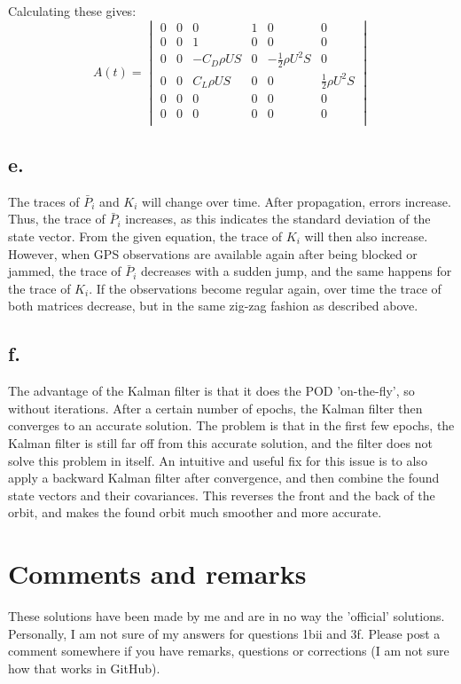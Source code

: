 \documentclass[a4paper,10pt,titlepage]{article}
\begin{document}
Calculating these gives:
\begin{equation*}
    A(t) = \begin{vmatrix}
    0 & 0 & 0 & 1 & 0 & 0  \\
    0 & 0 & 1 & 0 & 0 & 0  \\
    0 & 0 & - C_D \rho U S & 0 & -\frac{1}{2}\rho U^2 S  & 0 \\
    0 & 0 & C_L \rho U S & 0 & 0 & \frac{1}{2}\rho U^2 S  \\
    0 & 0 & 0 & 0 & 0 & 0  \\
    0 & 0 & 0 & 0 & 0 & 0  \\
    
\end{vmatrix}
\end{equation*}

\subsection*{e.}
The traces of $\bar{P}_i$ and $K_i$ will change over time. After propagation, errors increase. Thus, the trace of $\bar{P}_i$ increases, as this indicates the standard deviation of the state vector. From the given equation, the trace of $K_i$ will then also increase. However, when GPS observations are available again after being blocked or jammed, the trace of $\bar{P}_i$ decreases with a sudden jump, and the same happens for the trace of $K_i$. If the observations become regular again, over time the trace of both matrices decrease, but in the same zig-zag fashion as described above.
\subsection*{f.}
The advantage of the Kalman filter is that it does the POD 'on-the-fly', so without iterations. After a certain number of epochs, the Kalman filter then converges to an accurate solution. The problem is that in the first few epochs, the Kalman filter is still far off from this accurate solution, and the filter does not solve this problem in itself. An intuitive and useful fix for this issue is to also apply a backward Kalman filter after convergence, and then combine the found state vectors and their covariances. This reverses the front and the back of the orbit, and makes the found orbit much smoother and more accurate.

\section{Comments and remarks}
These solutions have been made by me and are in no way the 'official' solutions. Personally, I am not sure of my answers for questions 1bii and 3f. Please post a comment somewhere if you have remarks, questions or corrections (I am not sure how that works in GitHub).
\end{document}
